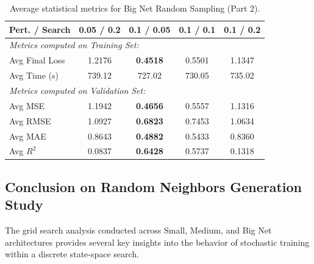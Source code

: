 \begin{table}[h]
\centering
\scriptsize
\begin{tabular}{|l|c|c|c|c|}
\hline
\textbf{Pert. / Search} & \textbf{0.05 / 0.2} & \textbf{0.1 / 0.05} & \textbf{0.1 / 0.1} & \textbf{0.1 / 0.2} \\ \hline
\multicolumn{5}{|l|}{\textit{Metrics computed on Training Set:}} \\ \hline
Avg Final Loss & 1.2176 & \textbf{0.4518} & 0.5501 & 1.1347 \\ \hline
Avg Time (s)   & 739.12 & 727.02 & 730.05 & 735.02 \\ \hline
\multicolumn{5}{|l|}{\textit{Metrics computed on Validation Set:}} \\ \hline
Avg MSE        & 1.1942 & \textbf{0.4656} & 0.5557 & 1.1316 \\ \hline
Avg RMSE       & 1.0927 & \textbf{0.6823} & 0.7453 & 1.0634 \\ \hline
Avg MAE        & 0.8643 & \textbf{0.4882} & 0.5433 & 0.8360 \\ \hline
Avg $R^2$      & 0.0837 & \textbf{0.6428} & 0.5737 & 0.1318 \\ \hline
\end{tabular}
\caption{Average statistical metrics for Big Net Random Sampling (Part 2).}
\label{tab:big_net_random_part2}
\end{table}

\newpage

\subsection{Conclusion on Random Neighbors Generation Study}

The grid search analysis conducted across Small, Medium, and Big Net architectures provides several key insights into the behavior of stochastic training within a discrete state-space search.

